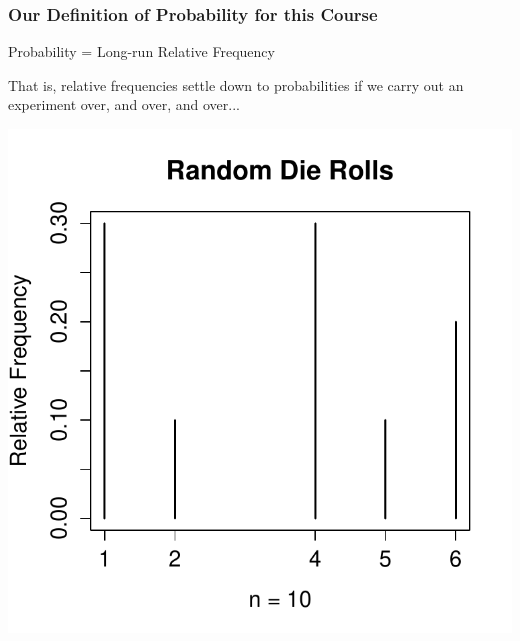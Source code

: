 \documentclass[handout]{beamer}
\begin{document}
\begin{frame}
\frametitle{Our Definition of Probability for this Course}
\begin{center}
\Large
Probability  = Long-run Relative Frequency
\end{center}

\vspace{3em}
\alert{That is, relative frequencies settle down to probabilities if we carry out an experiment over, and over, and over...}
\end{frame}
\begin{frame}

\centering
\includegraphics[scale = 0.7]{./images/die1}

\end{frame}
\end{document}

